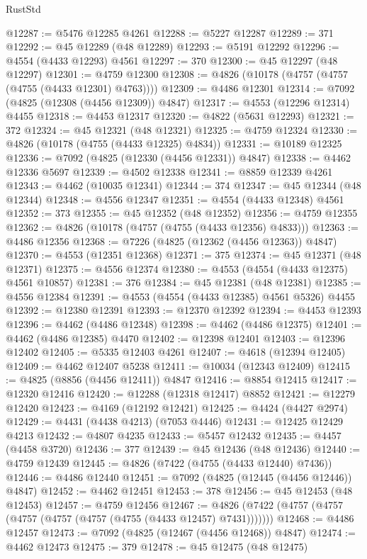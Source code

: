 \begin{lexlean}{RustStd}
\begin{coremodule}
@12287 := @5476 @12285 @4261
@12288 := @5227 @12287
@12289 := 371
@12292 := @45 @12289 (@48 @12289)
@12293 := @5191 @12292
@12296 := @4554 (@4433 @12293) @4561
@12297 := 370
@12300 := @45 @12297 (@48 @12297)
@12301 := @4759 @12300
@12308 := @4826 (@10178 (@4757 (@4757 (@4755 (@4433 @12301) @4763))))
@12309 := @4486 @12301
@12314 := @7092 (@4825 (@12308 (@4456 @12309)) @4847)
@12317 := @4553 (@12296 @12314) @4455
@12318 := @4453 @12317
@12320 := @4822 (@5631 @12293)
@12321 := 372
@12324 := @45 @12321 (@48 @12321)
@12325 := @4759 @12324
@12330 := @4826 (@10178 (@4755 (@4433 @12325) @4834))
@12331 := @10189 @12325
@12336 := @7092 (@4825 (@12330 (@4456 @12331)) @4847)
@12338 := @4462 @12336 @5697
@12339 := @4502 @12338
@12341 := @8859 @12339 @4261
@12343 := @4462 (@10035 @12341)
@12344 := 374
@12347 := @45 @12344 (@48 @12344)
@12348 := @4556 @12347
@12351 := @4554 (@4433 @12348) @4561
@12352 := 373
@12355 := @45 @12352 (@48 @12352)
@12356 := @4759 @12355
@12362 := @4826 (@10178 (@4757 (@4755 (@4433 @12356) @4833)))
@12363 := @4486 @12356
@12368 := @7226 (@4825 (@12362 (@4456 @12363)) @4847)
@12370 := @4553 (@12351 @12368)
@12371 := 375
@12374 := @45 @12371 (@48 @12371)
@12375 := @4556 @12374
@12380 := @4553 (@4554 (@4433 @12375) @4561 @10857)
@12381 := 376
@12384 := @45 @12381 (@48 @12381)
@12385 := @4556 @12384
@12391 := @4553 (@4554 (@4433 @12385) @4561 @5326) @4455
@12392 := @12380 @12391
@12393 := @12370 @12392
@12394 := @4453 @12393
@12396 := @4462 (@4486 @12348)
@12398 := @4462 (@4486 @12375)
@12401 := @4462 (@4486 @12385) @4470
@12402 := @12398 @12401
@12403 := @12396 @12402
@12405 := @5335 @12403 @4261
@12407 := @4618 (@12394 @12405)
@12409 := @4462 @12407 @5238
@12411 := @10034 (@12343 @12409)
@12415 := @4825 (@8856 (@4456 @12411)) @4847
@12416 := @8854 @12415
@12417 := @12320 @12416
@12420 := @12288 (@12318 @12417) @8852
@12421 := @12279 @12420
@12423 := @4169 (@12192 @12421)
@12425 := @4424 (@4427 @2974)
@12429 := @4431 (@4438 @4213) (@7053 @4446)
@12431 := @12425 @12429 @4213
@12432 := @4807 @4235
@12433 := @5457 @12432
@12435 := @4457 (@4458 @3720)
@12436 := 377
@12439 := @45 @12436 (@48 @12436)
@12440 := @4759 @12439
@12445 := @4826 (@7422 (@4755 (@4433 @12440) @7436))
@12446 := @4486 @12440
@12451 := @7092 (@4825 (@12445 (@4456 @12446)) @4847)
@12452 := @4462 @12451
@12453 := 378
@12456 := @45 @12453 (@48 @12453)
@12457 := @4759 @12456
@12467 := @4826 (@7422 (@4757 (@4757 (@4757 (@4757 (@4757 (@4755 (@4433 @12457) @7431)))))))
@12468 := @4486 @12457
@12473 := @7092 (@4825 (@12467 (@4456 @12468)) @4847)
@12474 := @4462 @12473
@12475 := 379
@12478 := @45 @12475 (@48 @12475)

\end{coremodule}
\end{lexlean}

